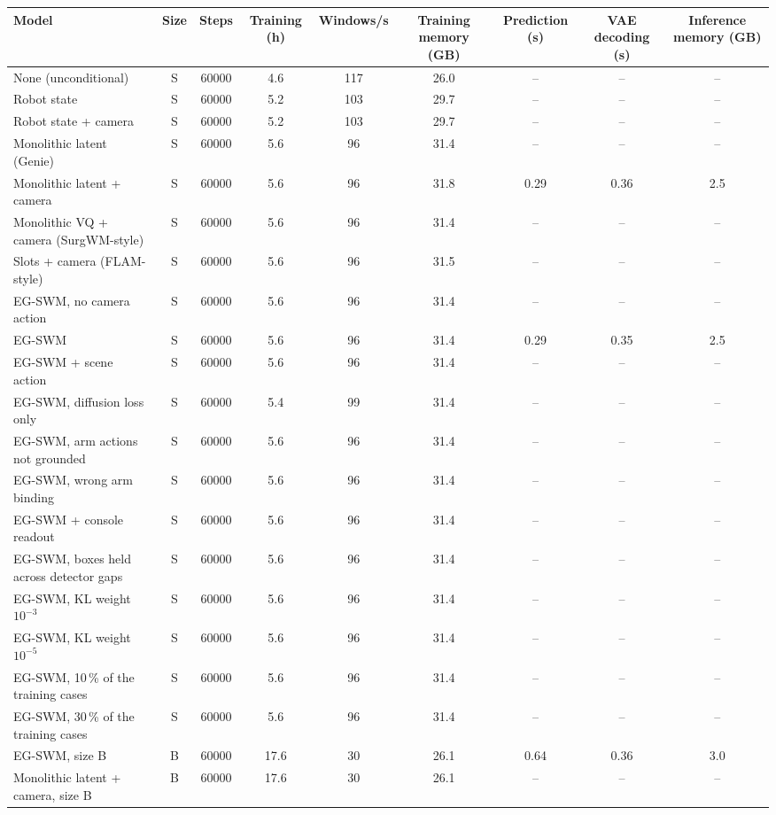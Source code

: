 \begin{tabular}{lcccccccc}
\toprule
Model & Size & Steps & Training (h) & Windows/s & Training memory (GB) & Prediction (s) & VAE decoding (s) & Inference memory (GB) \\
\midrule
None (unconditional) & S & 60000 & 4.6 & 117 & 26.0 & -- & -- & -- \\
Robot state & S & 60000 & 5.2 & 103 & 29.7 & -- & -- & -- \\
Robot state + camera & S & 60000 & 5.2 & 103 & 29.7 & -- & -- & -- \\
Monolithic latent (Genie) & S & 60000 & 5.6 & 96 & 31.4 & -- & -- & -- \\
Monolithic latent + camera & S & 60000 & 5.6 & 96 & 31.8 & 0.29 & 0.36 & 2.5 \\
Monolithic VQ + camera (SurgWM-style) & S & 60000 & 5.6 & 96 & 31.4 & -- & -- & -- \\
Slots + camera (FLAM-style) & S & 60000 & 5.6 & 96 & 31.5 & -- & -- & -- \\
EG-SWM, no camera action & S & 60000 & 5.6 & 96 & 31.4 & -- & -- & -- \\
EG-SWM & S & 60000 & 5.6 & 96 & 31.4 & 0.29 & 0.35 & 2.5 \\
EG-SWM + scene action & S & 60000 & 5.6 & 96 & 31.4 & -- & -- & -- \\
EG-SWM, diffusion loss only & S & 60000 & 5.4 & 99 & 31.4 & -- & -- & -- \\
EG-SWM, arm actions not grounded & S & 60000 & 5.6 & 96 & 31.4 & -- & -- & -- \\
EG-SWM, wrong arm binding & S & 60000 & 5.6 & 96 & 31.4 & -- & -- & -- \\
EG-SWM + console readout & S & 60000 & 5.6 & 96 & 31.4 & -- & -- & -- \\
EG-SWM, boxes held across detector gaps & S & 60000 & 5.6 & 96 & 31.4 & -- & -- & -- \\
EG-SWM, KL weight $10^{-3}$ & S & 60000 & 5.6 & 96 & 31.4 & -- & -- & -- \\
EG-SWM, KL weight $10^{-5}$ & S & 60000 & 5.6 & 96 & 31.4 & -- & -- & -- \\
EG-SWM, 10\,\% of the training cases & S & 60000 & 5.6 & 96 & 31.4 & -- & -- & -- \\
EG-SWM, 30\,\% of the training cases & S & 60000 & 5.6 & 96 & 31.4 & -- & -- & -- \\
EG-SWM, size B & B & 60000 & 17.6 & 30 & 26.1 & 0.64 & 0.36 & 3.0 \\
Monolithic latent + camera, size B & B & 60000 & 17.6 & 30 & 26.1 & -- & -- & -- \\
\bottomrule
\end{tabular}
